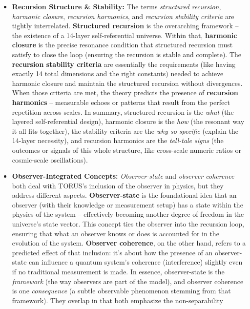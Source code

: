 \documentclass[]{article}
\begin{document}
{\begin{itemize}
\item
  \textbf{Recursion Structure \& Stability:} The terms \emph{structured
  recursion}, \emph{harmonic closure}, \emph{recursion harmonics}, and
  \emph{recursion stability criteria} are tightly interrelated.
  \textbf{Structured recursion} is the overarching framework -- the
  existence of a 14-layer self-referential universe. Within that,
  \textbf{harmonic closure} is the precise resonance condition that
  structured recursion must satisfy to close the loop (ensuring the
  recursion is stable and complete). The \textbf{recursion stability
  criteria} are essentially the requirements (like having exactly 14
  total dimensions and the right constants) needed to achieve harmonic
  closure and maintain the structured recursion without divergences​.
  When those criteria are met, the theory predicts the presence of
  \textbf{recursion harmonics} -- measurable echoes or patterns that
  result from the perfect repetition across scales. In summary,
  structured recursion is the \emph{what} (the layered self-referential
  design), harmonic closure is the \emph{how} (the resonant way it all
  fits together), the stability criteria are the \emph{why so specific}
  (explain the 14-layer necessity), and recursion harmonics are the
  \emph{tell-tale signs} (the outcomes or signals of this whole
  structure, like cross-scale numeric ratios or cosmic-scale
  oscillations).
\item
  \textbf{Observer-Integrated Concepts:} \emph{Observer-state} and
  \emph{observer coherence} both deal with TORUS's inclusion of the
  observer in physics, but they address different aspects.
  \textbf{Observer-state} is the foundational idea that an observer
  (with their knowledge or measurement setup) has a state within the
  physics of the system -- effectively becoming another degree of
  freedom in the universe's state vector​. This concept ties the
  observer into the recursion loop, ensuring that what an observer knows
  or does is accounted for in the evolution of the system.
  \textbf{Observer coherence}, on the other hand, refers to a predicted
  effect of that inclusion: it's about how the presence of an
  observer-state can influence a quantum system's coherence
  (interference) slightly even if no traditional measurement is made​.
  In essence, observer-state is the \emph{framework} (the way observers
  are part of the model), and observer coherence is one
  \emph{consequence} (a subtle observable phenomenon stemming from that
  framework). They overlap in that both emphasize the non-separability

\end{itemize}}
\end{document}

